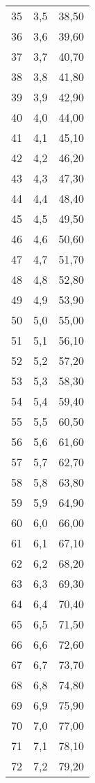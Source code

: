 \documentclass{article}
\begin{document}
\begin{longtable}{|r|r|r|}
        35 & 3,5 & 38,50 \\ 
        36 & 3,6 & 39,60 \\ 
        37 & 3,7 & 40,70 \\ 
        38 & 3,8 & 41,80 \\ 
        39 & 3,9 & 42,90 \\ 
        40 & 4,0 & 44,00 \\ 
        41 & 4,1 & 45,10 \\ 
        42 & 4,2 & 46,20 \\ 
        43 & 4,3 & 47,30 \\ 
        44 & 4,4 & 48,40 \\ 
        45 & 4,5 & 49,50 \\ 
        46 & 4,6 & 50,60 \\ 
        47 & 4,7 & 51,70 \\ 
        48 & 4,8 & 52,80 \\ 
        49 & 4,9 & 53,90 \\ 
        50 & 5,0 & 55,00 \\ 
        51 & 5,1 & 56,10 \\ 
        52 & 5,2 & 57,20 \\ 
        53 & 5,3 & 58,30 \\ 
        54 & 5,4 & 59,40 \\ 
        55 & 5,5 & 60,50 \\ 
        56 & 5,6 & 61,60 \\ 
        57 & 5,7 & 62,70 \\ 
        58 & 5,8 & 63,80 \\ 
        59 & 5,9 & 64,90 \\ 
        60 & 6,0 & 66,00 \\ 
        61 & 6,1 & 67,10 \\ 
        62 & 6,2 & 68,20 \\ 
        63 & 6,3 & 69,30 \\ 
        64 & 6,4 & 70,40 \\ 
        65 & 6,5 & 71,50 \\ 
        66 & 6,6 & 72,60 \\ 
        67 & 6,7 & 73,70 \\ 
        68 & 6,8 & 74,80 \\ 
        69 & 6,9 & 75,90 \\ 
        70 & 7,0 & 77,00 \\ 
        71 & 7,1 & 78,10 \\ 
        72 & 7,2 & 79,20 \\ 

\end{longtable}
\end{document}
